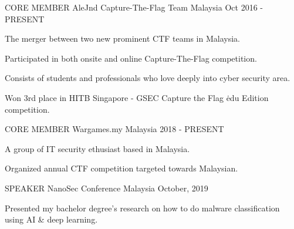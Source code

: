 

\begin{cventries}

    
    \cventry
    {CORE MEMBER}
    {AleJnd Capture-The-Flag Team}
    {Malaysia}
    {Oct 2016 - PRESENT}
    {
      \begin{cvitems}
        \item {The merger between two new prominent CTF teams in Malaysia.}
        \item {Participated in both onsite and online Capture-The-Flag competition.}
        \item {Consists of students and professionals who love deeply into cyber security area.}
        \item {Won 3rd place in HITB Singapore - GSEC Capture the Flag \.edu Edition competition.}
      \end{cvitems}
    }

    \cventry
    {CORE MEMBER}
    {Wargames.my}
    {Malaysia}
    {2018 - PRESENT}
    {
      \begin{cvitems}
        \item {A group of IT security ethusiast based in Malaysia.}
        \item {Organized annual CTF competition targeted towards Malaysian.}
      \end{cvitems}
    }

    \cventry
    {SPEAKER}
    {NanoSec Conference}
    {Malaysia}
    {October, 2019}
    {
      \begin{cvitems}
        \item {Presented my bachelor degree's research on how to do malware classification using AI \& deep learning.}
      \end{cvitems}
    }
\end{cventries}
